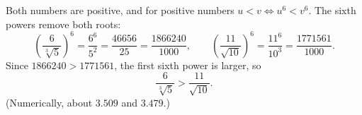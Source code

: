 Both numbers are positive, and for positive numbers $u<v\iff u^6<v^6$. The sixth powers remove both roots:
\[\left(\dfrac{6}{\sqrt[3]5}\right)^6=\dfrac{6^6}{5^2}=\dfrac{46656}{25}=\dfrac{1866240}{1000},\qquad\left(\dfrac{11}{\sqrt{10}}\right)^6=\dfrac{11^6}{10^3}=\dfrac{1771561}{1000}.\]
Since $1866240>1771561$, the first sixth power is larger, so
\[\boxed{\dfrac{6}{\sqrt[3]5}>\dfrac{11}{\sqrt{10}}}.\]
(Numerically, about $3.509$ and $3.479$.)
